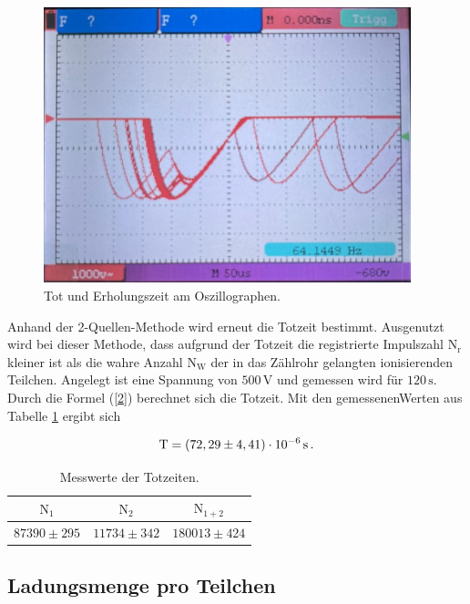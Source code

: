 \begin{figure}[H]
    \centering
    \includegraphics[height=80mm]{bilder/2.jpeg}
    \caption{Tot und Erholungszeit am Oszillographen.\label{Abbildung7} }
\end{figure}

\begin{flushleft}
    Anhand der 2-Quellen-Methode wird erneut die Totzeit bestimmt.
    Ausgenutzt wird bei dieser Methode, dass aufgrund der Totzeit die registrierte Impulszahl $\text{N}_{\text{r}}$ kleiner ist als die wahre Anzahl $\text{N}_{\text{W}}$ der in das Zählrohr gelangten ionisierenden Teilchen.
    Angelegt ist eine Spannung von $500\,\unit{\volt}$ und gemessen wird für $120\,\unit{\second}$.
    Durch die Formel (\ref{2}) berechnet sich die Totzeit.
    Mit den gemessenenWerten aus Tabelle \ref{Tabelle2} ergibt sich
\end{flushleft}

\begin{equation}
    \text{T} = ( 72,29 \pm 4,41 )\cdot 10^{-6} \,\unit{\second}\,. \notag
\end{equation}

\begin{table}[H]
    \centering
    \caption{Messwerte der Totzeiten.} 
    \label{Tabelle2}
    \begin{tabular} {c  c  c}
        \toprule
        {$ \text{N}_{1} $} &
        {$ \text{N}_{2} $} &
        {$ \text{N}_{1+2}$} \\
        \midrule
        $87390 \pm 295$ & $11734 \pm 342$ & $180013 \pm 424$ \\
        \bottomrule
    \end{tabular} 
\end{table}


\subsection{Ladungsmenge pro Teilchen}

